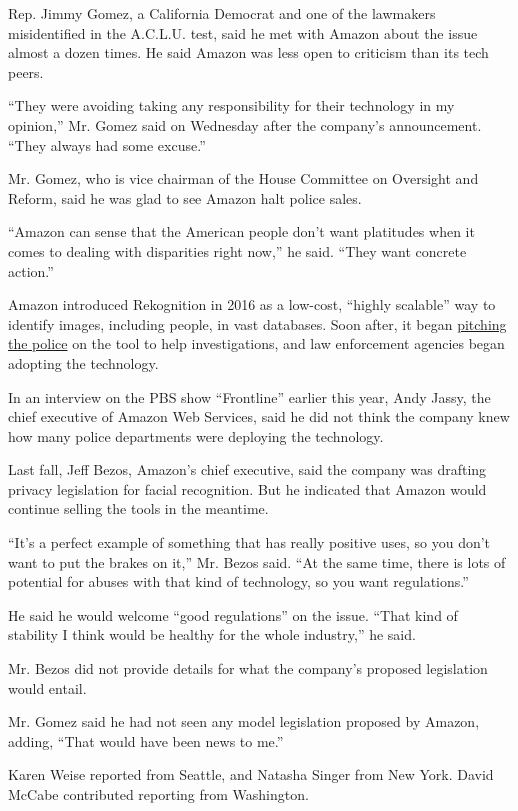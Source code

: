 Rep. Jimmy Gomez, a California Democrat and one of the lawmakers
misidentified in the A.C.L.U. test, said he met with Amazon about the
issue almost a dozen times. He said Amazon was less open to criticism
than its tech peers.

``They were avoiding taking any responsibility for their technology in
my opinion,'' Mr. Gomez said on Wednesday after the company's
announcement. ``They always had some excuse.''

Mr. Gomez, who is vice chairman of the House Committee on Oversight and
Reform, said he was glad to see Amazon halt police sales.

``Amazon can sense that the American people don't want platitudes when
it comes to dealing with disparities right now,'' he said. ``They want
concrete action.''

Amazon introduced Rekognition in 2016 as a low-cost, ``highly scalable''
way to identify images, including people, in vast databases. Soon after,
it began
\href{https://www.nytimes.com/2018/05/22/technology/amazon-facial-recognition.html}{pitching
the police} on the tool to help investigations, and law enforcement
agencies began adopting the technology.

In an interview on the PBS show ``Frontline'' earlier this year, Andy
Jassy, the chief executive of Amazon Web Services, said he did not think
the company knew how many police departments were deploying the
technology.

Last fall, Jeff Bezos, Amazon's chief executive, said the company was
drafting privacy legislation for facial recognition. But he indicated
that Amazon would continue selling the tools in the meantime.

``It's a perfect example of something that has really positive uses, so
you don't want to put the brakes on it,'' Mr. Bezos said. ``At the same
time, there is lots of potential for abuses with that kind of
technology, so you want regulations.''

He said he would welcome ``good regulations'' on the issue. ``That kind
of stability I think would be healthy for the whole industry,'' he said.

Mr. Bezos did not provide details for what the company's proposed
legislation would entail.

Mr. Gomez said he had not seen any model legislation proposed by Amazon,
adding, ``That would have been news to me.''

Karen Weise reported from Seattle, and Natasha Singer from New York.
David McCabe contributed reporting from Washington.


